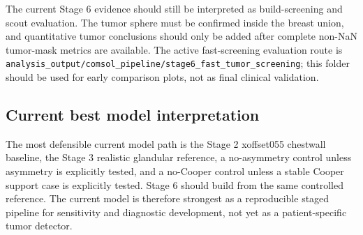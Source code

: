 The current Stage 6 evidence should still be interpreted as build-screening and scout evaluation. The tumor sphere must be confirmed inside the breast union, and quantitative tumor conclusions should only be added after complete non-NaN tumor-mask metrics are available. The active fast-screening evaluation route is \texttt{analysis\_output/comsol\_pipeline/stage6\_fast\_tumor\_screening}; this folder should be used for early comparison plots, not as final clinical validation.

\subsection{Current best model interpretation}

The most defensible current model path is the Stage 2 xoffset055 chestwall baseline, the Stage 3 realistic glandular reference, a no-asymmetry control unless asymmetry is explicitly tested, and a no-Cooper control unless a stable Cooper support case is explicitly tested. Stage 6 should build from the same controlled reference. The current model is therefore strongest as a reproducible staged pipeline for sensitivity and diagnostic development, not yet as a patient-specific tumor detector.
